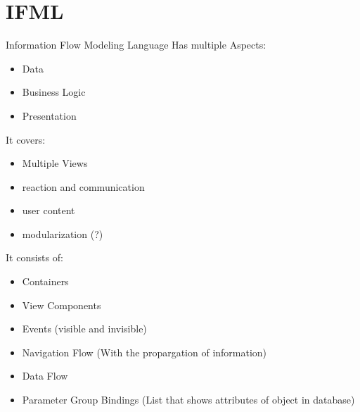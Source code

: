 \documentclass[a4paper]{article}
\begin{document}
\section{IFML}
Information Flow Modeling Language
Has multiple Aspects:\begin{itemize}
\setlength{\itemsep}{-4pt}
\item Data
\item Business Logic
\item Presentation
\end{itemize}
It covers:
\begin{itemize}
\setlength{\itemsep}{-4pt}
\item Multiple Views
\item reaction and communication
\item user content
\item modularization (?)
\end{itemize}
It consists of:
\begin{itemize}
\setlength{\itemsep}{-4pt}
\item Containers
\item View Components
\item Events (visible and invisible)
\item Navigation Flow (With the propargation of information)
\item Data Flow
\item Parameter Group Bindings (List that shows attributes of object in database)
\end{itemize}
\end{document}
